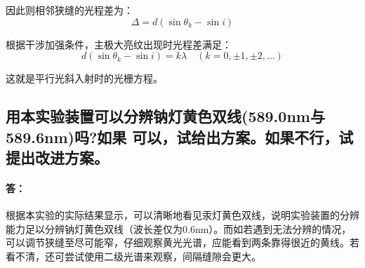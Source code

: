 \documentclass[]{../template/Report}%
\begin{document}
\begin{fullreportonly}
因此则相邻狭缝的光程差为：
\[\Delta = d(\sin \theta_k - \sin i)
\]

根据干涉加强条件，主极大亮纹出现时光程差满足：
\[d(\sin \theta_k - \sin i) = k \lambda \quad (k = 0, \pm 1, \pm 2, \dots)
\]

这就是平行光斜入射时的光栅方程。
\subsection{用本实验装置可以分辨钠灯黄色双线(589.0nm与 589.6nm)吗?如果
可以，试给出方案。如果不行，试提出改进方案。}

\paragraph{答：}根据本实验的实际结果显示，可以清晰地看见汞灯黄色双线，说明实验装置的分辨能力足以分辨钠灯黄色双线（波长差仅为0.6nm）。而如若遇到无法分辨的情况，可以调节狭缝至尽可能窄，仔细观察黄光光谱，应能看到两条靠得很近的黄线。若看不清，还可尝试使用二级光谱来观察，间隔缝隙会更大。

\end{fullreportonly}
\insertnotes
\end{document}
